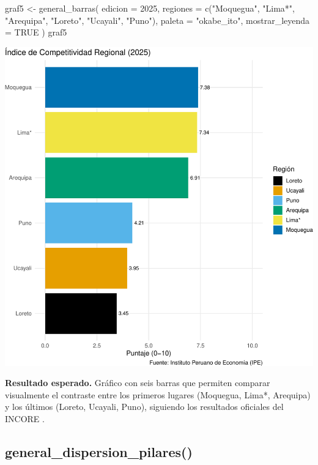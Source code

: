 \documentclass[
  11pt,
  letterpaper,
  DIV=11,
  numbers=noendperiod]{scrartcl}
\newenvironment{Shaded}{\begin{snugshade}}{\end{snugshade}}
\newcommand{\AttributeTok}[1]{\textcolor[rgb]{0.40,0.45,0.13}{#1}}
\newcommand{\ConstantTok}[1]{\textcolor[rgb]{0.56,0.35,0.01}{#1}}
\newcommand{\DecValTok}[1]{\textcolor[rgb]{0.68,0.00,0.00}{#1}}
\newcommand{\FunctionTok}[1]{\textcolor[rgb]{0.28,0.35,0.67}{#1}}
\newcommand{\NormalTok}[1]{\textcolor[rgb]{0.00,0.23,0.31}{#1}}
\newcommand{\OtherTok}[1]{\textcolor[rgb]{0.00,0.23,0.31}{#1}}
\newcommand{\StringTok}[1]{\textcolor[rgb]{0.13,0.47,0.30}{#1}}
\begin{document}
\begin{Shaded}
\begin{Highlighting}[]
\NormalTok{graf5 }\OtherTok{\textless{}{-}} \FunctionTok{general\_barras}\NormalTok{(}
  \AttributeTok{edicion =} \DecValTok{2025}\NormalTok{,}
  \AttributeTok{regiones =} \FunctionTok{c}\NormalTok{(}\StringTok{"Moquegua"}\NormalTok{, }\StringTok{"Lima*"}\NormalTok{, }\StringTok{"Arequipa"}\NormalTok{,}
               \StringTok{"Loreto"}\NormalTok{, }\StringTok{"Ucayali"}\NormalTok{, }\StringTok{"Puno"}\NormalTok{),}
  \AttributeTok{paleta =} \StringTok{"okabe\_ito"}\NormalTok{,}
  \AttributeTok{mostrar\_leyenda =} \ConstantTok{TRUE}
\NormalTok{)}
\NormalTok{graf5}
\end{Highlighting}
\end{Shaded}

\includegraphics{Manual_files/figure-pdf/unnamed-chunk-20-1.pdf}

\textbf{Resultado esperado.} Gráfico con seis barras que permiten
comparar visualmente el contraste entre los primeros lugares (Moquegua,
Lima*, Arequipa) y los últimos (Loreto, Ucayali, Puno), siguiendo los
resultados oficiales del INCORE .

\subsection{\texorpdfstring{\textbf{general\_dispersion\_pilares()}}{general\_dispersion\_pilares()}}\label{general_dispersion_pilares}
\end{document}
